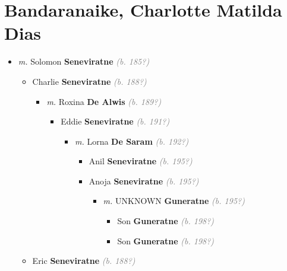 \documentclass[10pt, openany]{book}
\begin{document}
\chapter{Bandaranaike, Charlotte Matilda Dias}
\label{00002111}
\textcolor{slmaroon}{\textit{}}
\begin{itemize}
\item{\textit{m.} Solomon \textbf{Seneviratne} \textcolor{gray}{\textit{(b. 185?)}}   \label{couple:00002111:00002112} \begin{itemize}
\item{Charlie \textbf{Seneviratne} \textcolor{gray}{\textit{(b. 188?)}}
\begin{itemize}
\item{\textit{m.} Roxina \textbf{De Alwis} \textcolor{gray}{\textit{(b. 189?)}}   \label{couple:00002132:00002133} \begin{itemize}
\item{Eddie \textbf{Seneviratne} \textcolor{gray}{\textit{(b. 191?)}}
\begin{itemize}
\item{\textit{m.} Lorna \textbf{De Saram} \textcolor{gray}{\textit{(b. 192?)}}   \label{couple:00002134:00002135} \begin{itemize}
\item{Anil \textbf{Seneviratne} \textcolor{gray}{\textit{(b. 195?)}}
 }
\item{Anoja \textbf{Seneviratne} \textcolor{gray}{\textit{(b. 195?)}}
\begin{itemize}
\item{\textit{m.} UNKNOWN \textbf{Guneratne} \textcolor{gray}{\textit{(b. 195?)}}   \label{couple:00002136:00002137} \begin{itemize}
\item{Son \textbf{Guneratne} \textcolor{gray}{\textit{(b. 198?)}}
 }
\item{Son \textbf{Guneratne} \textcolor{gray}{\textit{(b. 198?)}}
 }
\end{itemize}}
\end{itemize}
 }
\end{itemize}}
\end{itemize}
 }
\end{itemize}}
\end{itemize}
 }
\item{Eric \textbf{Seneviratne} \textcolor{gray}{\textit{(b. 188?)}}
}
\end{itemize}}
\end{itemize}
\end{document}
